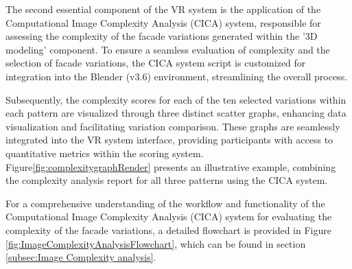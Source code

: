 %    

The second essential component of the VR system is the application of the Computational Image Complexity Analysis (CICA) system, responsible for assessing the complexity of the facade variations generated within the '3D modeling' component.
To ensure a seamless evaluation of complexity and the selection of facade variations, the CICA system script is customized for integration into the Blender (v3.6) environment, streamlining the overall process.

Subsequently, the complexity scores for each of the ten selected variations within each pattern are visualized through three distinct scatter graphs, enhancing data visualization and facilitating variation comparison.
These graphs are seamlessly integrated into the VR system interface, providing participants with access to quantitative metrics within the scoring system.
Figure\ref{fig:complexitygraphRender} presents an illustrative example, combining the complexity analysis report for all three patterns using the CICA system.

For a comprehensive understanding of the workflow and functionality of the Computational Image Complexity Analysis (CICA) system for evaluating the complexity of the facade variations, a detailed flowchart is provided in Figure \ref{fig:ImageComplexityAnalysisFlowchart}, which can be found in section \ref{subsec:Image Complexity analysis}.

